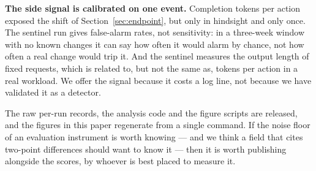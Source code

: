 \textbf{The side signal is calibrated on one event.} Completion tokens per
action exposed the shift of Section~\ref{sec:endpoint}, but only in hindsight
and only once. The sentinel run gives false-alarm rates, not sensitivity: in a
three-week window with no known changes it can say how often it would alarm by
chance, not how often a real change would trip it. And the sentinel measures
the output length of fixed requests, which is related to, but not the same as,
tokens per action in a real workload. We offer the signal because it costs a
log line, not because we have validated it as a detector.

The raw
per-run records, the analysis code and the figure scripts are released, and the
figures in this paper regenerate from a single command. If the noise floor of
an evaluation instrument is worth knowing --- and we think a field that cites
two-point differences should want to know it --- then it is worth publishing
alongside the scores, by whoever is best placed to measure it.
